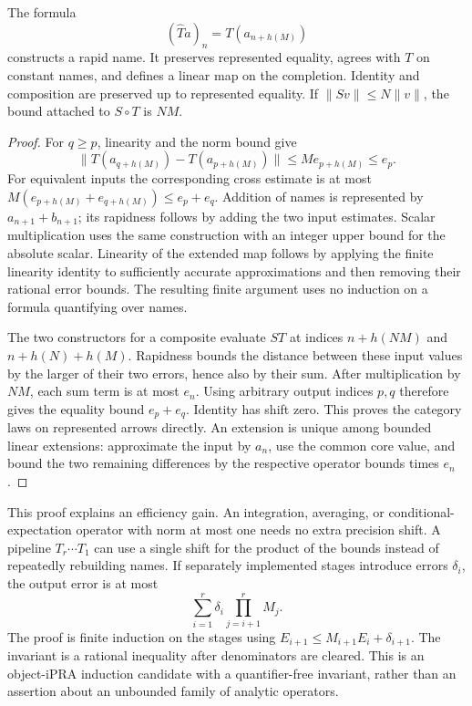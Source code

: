 \begin{theorem}
\label{ct:extension}
The formula
\[
                   (\widehat T a)_n=T(a_{n+h(M)})
\]
constructs a rapid name. It preserves represented equality, agrees with $T$
on constant names, and defines a linear map on the completion. Identity and
composition are preserved up to represented equality. If $\|Sv\|\leq N\|v\|$,
the bound attached to $S\circ T$ is $NM$.
\end{theorem}
\begin{proof}
For $q\geq p$, linearity and the norm bound give
\[
 \|T(a_{q+h(M)})-T(a_{p+h(M)})\|
 \leq M e_{p+h(M)}\leq e_p.
\]
For equivalent inputs the corresponding cross estimate is at most
$M(e_{p+h(M)}+e_{q+h(M)})\leq e_p+e_q$.
Addition of names is represented by $a_{n+1}+b_{n+1}$; its rapidness follows
by adding the two input estimates. Scalar multiplication uses the same
construction with an integer upper bound for the absolute scalar.
Linearity of the extended map follows by applying the finite linearity
identity to sufficiently accurate approximations and then removing their
rational error bounds. The resulting finite argument uses no induction on
a formula quantifying over names.

The two constructors for a composite evaluate $ST$ at indices
$n+h(NM)$ and $n+h(N)+h(M)$. Rapidness bounds the distance between these
input values by the larger of their two errors, hence also by their sum.
After multiplication by $NM$, each sum term is at most $e_n$.
Using arbitrary output indices $p,q$ therefore gives the equality bound
$e_p+e_q$. Identity has shift zero. This proves the category laws on
represented arrows directly. An extension is unique among bounded linear
extensions: approximate the input by $a_n$, use the common core value, and
bound the two remaining differences by the respective operator bounds
times $e_n$.\end{proof}

This proof explains an efficiency gain. An integration, averaging, or
conditional-expectation operator with norm at most one needs no extra
precision shift. A pipeline $T_r\cdots T_1$ can use a single shift for the
product of the bounds instead of repeatedly rebuilding names. If separately
implemented stages introduce errors $\delta_i$, the output error is at most
\[
 \sum_{i=1}^r\delta_i\prod_{j=i+1}^rM_j.
\]
The proof is finite induction on the stages using
$E_{i+1}\leq M_{i+1}E_i+\delta_{i+1}$. The invariant is a rational
inequality after denominators are cleared. This is an object-iPRA induction
candidate with a quantifier-free invariant, rather than an assertion about
an unbounded family of analytic operators.

